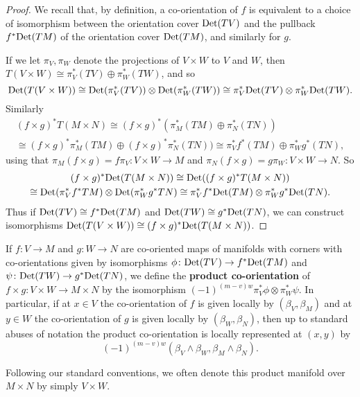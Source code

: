 \begin{proof}
	We recall that, by definition, a co-orientation of $f$ is equivalent to a choice of isomorphism between the orientation cover ${\rm Det}(TV)$ and the pullback $f^*{\rm Det}(TM)$ of the orientation cover ${\rm Det}(TM)$, and similarly for $g$.

	If we let $\pi_V, \pi_W$ denote the projections of $V \times W$ to $V$ and $W$, then $T(V \times W) \cong \pi_V^*(TV) \oplus \pi_W^*(TW)$, and so $${\rm Det}(T(V \times W)) \cong {\rm Det}(\pi_V^*(TV))\otimes{\rm Det}(\pi_W^*(TW)) \cong \pi_V^*{\rm Det}(TV)\otimes\pi_W^*{\rm Det}(TW).$$ Similarly
	\begin{multline*}(f \times g)^*T(M \times N) \cong (f \times g)^*(\pi_M^*(TM) \oplus \pi_N^*(TN))\\
		 \cong (f \times g)^*\pi_M^*(TM) \oplus (f \times g)^*\pi_N^*(TN)) \cong \pi_V^*f^*(TM) \oplus \pi_W^*g^*(TN),
	\end{multline*}
	using that $\pi_M(f \times g) = f\pi_V \colon V \times W \to M$ and $\pi_N(f \times g) = g\pi_W \colon V \times W \to N$.
	So
	\begin{multline*}
		(f \times g)^*{\rm Det}(T(M \times N)) \cong {\rm Det}((f \times g)^*T(M \times N))\\ \cong {\rm Det}(\pi_V^*f^*TM) \otimes {\rm Det}(\pi_W^*g^*TN) \cong \pi_V^*f^*{\rm Det}(TM) \otimes \pi_W^*g^*{\rm Det}(TN).
	\end{multline*}
	Thus if ${\rm Det}(TV) \cong f^*{\rm Det}(TM)$ and ${\rm Det}(TW) \cong g^*{\rm Det}(TN)$, we can construct isomorphisms ${\rm Det}(T(V \times W)) \cong (f \times g)^*{\rm Det}(T(M \times N))$.
\end{proof}

\begin{definition}\label{D: co-oriented exterior}
	If $f \colon V \to M$ and $g \colon W \to N$ are co-oriented maps of manifolds with corners with co-orientations given by isomorphisms $\phi \colon {\rm Det}(TV) \to f^*{\rm Det}(TM)$ and $\psi \colon {\rm Det}(TW) \to g^*{\rm Det}(TN)$, we define the \textbf{product co-orientation} of $f \times g \colon V \times W \to M \times N$ by the isomorphism $(-1)^{(m-v)w}\pi_V^*\phi \otimes \pi_W^*\psi$.
	In particular, if at $x \in V$ the co-orientation of $f$ is given locally by $(\beta_V,\beta_M)$ and at $y \in W$ the co-orientation of $g$ is given locally by $(\beta_W,\beta_N)$, then up to standard abuses of notation the product co-orientation is locally represented at $(x,y)$ by $$(-1)^{(m-v)w}(\beta_V \wedge \beta_W,\beta_M \wedge \beta_N).$$

	Following our standard conventions, we often denote this product manifold over $M \times N$ by simply $V \times W$.
\end{definition}

